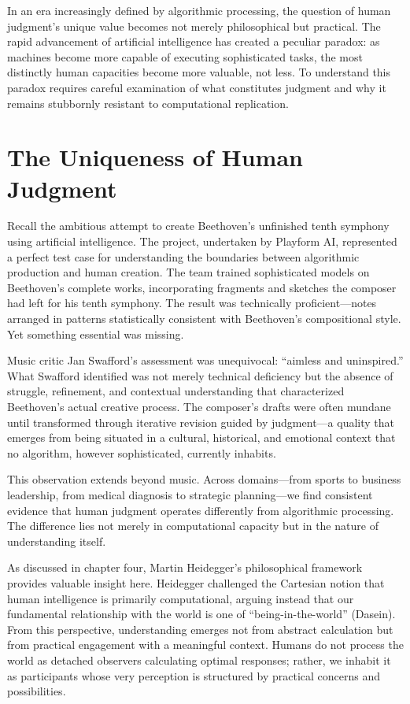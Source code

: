 \documentclass[
  Letterpaper,
]{scrbook}
\begin{document}
\hfill\break

In an era increasingly defined by algorithmic processing, the question
of human judgment's unique value becomes not merely philosophical but
practical. The rapid advancement of artificial intelligence has created
a peculiar paradox: as machines become more capable of executing
sophisticated tasks, the most distinctly human capacities become more
valuable, not less. To understand this paradox requires careful
examination of what constitutes judgment and why it remains stubbornly
resistant to computational replication.

\section{The Uniqueness of Human
Judgment}\label{the-uniqueness-of-human-judgment}

Recall the ambitious attempt to create Beethoven's unfinished tenth
symphony using artificial intelligence. The project, undertaken by
Playform AI, represented a perfect test case for understanding the
boundaries between algorithmic production and human creation. The team
trained sophisticated models on Beethoven's complete works,
incorporating fragments and sketches the composer had left for his tenth
symphony. The result was technically proficient---notes arranged in
patterns statistically consistent with Beethoven's compositional style.
Yet something essential was missing.

Music critic Jan Swafford's assessment was unequivocal: ``aimless and
uninspired.'' What Swafford identified was not merely technical
deficiency but the absence of struggle, refinement, and contextual
understanding that characterized Beethoven's actual creative process.
The composer's drafts were often mundane until transformed through
iterative revision guided by judgment---a quality that emerges from
being situated in a cultural, historical, and emotional context that no
algorithm, however sophisticated, currently inhabits.

This observation extends beyond music. Across domains---from sports to
business leadership, from medical diagnosis to strategic planning---we
find consistent evidence that human judgment operates differently from
algorithmic processing. The difference lies not merely in computational
capacity but in the nature of understanding itself.

As discussed in chapter four, Martin Heidegger's philosophical framework
provides valuable insight here. Heidegger challenged the Cartesian
notion that human intelligence is primarily computational, arguing
instead that our fundamental relationship with the world is one of
``being-in-the-world'' (Dasein). From this perspective, understanding
emerges not from abstract calculation but from practical engagement with
a meaningful context. Humans do not process the world as detached
observers calculating optimal responses; rather, we inhabit it as
participants whose very perception is structured by practical concerns
and possibilities.
\end{document}
